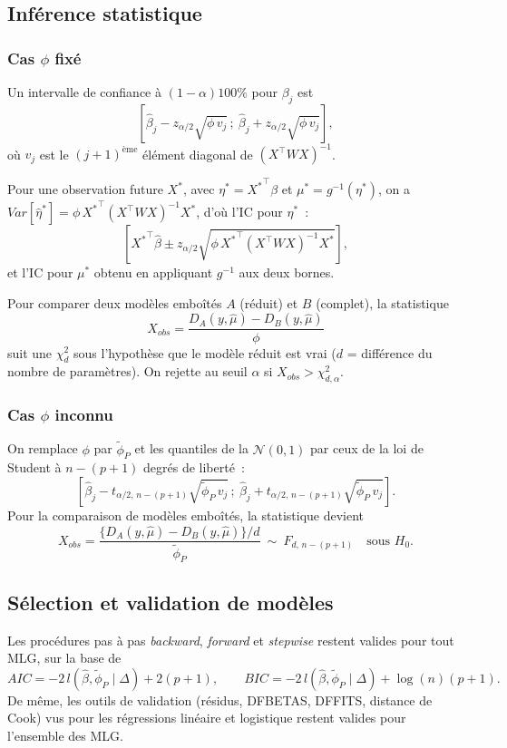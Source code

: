 \documentclass[11pt,letterpaper]{article}
\begin{document}
\subsection{Inférence statistique}

\subsubsection{Cas $\phi$ fixé}

Un intervalle de confiance à $(1-\alpha)100\%$ pour $\beta_j$ est
$$\left[\hat\beta_j - z_{\alpha/2}\sqrt{\phi\, v_j}\,;\ \hat\beta_j + z_{\alpha/2}\sqrt{\phi\, v_j}\right],$$
où $v_j$ est le $(j+1)^{\text{ème}}$ élément diagonal de $(X^\top W X)^{-1}$.

Pour une observation future $X^*$, avec $\eta^* = {X^*}^\top\beta$ et $\mu^* = g^{-1}(\eta^*)$, on a $Var[\hat\eta^*] = \phi\,{X^*}^\top(X^\top W X)^{-1}X^*$, d'où l'IC pour $\eta^*$~:
$$\left[{X^*}^\top\hat\beta \pm z_{\alpha/2}\sqrt{\phi\,{X^*}^\top(X^\top WX)^{-1}X^*}\right],$$
et l'IC pour $\mu^*$ obtenu en appliquant $g^{-1}$ aux deux bornes.

Pour comparer deux modèles emboîtés $A$ (réduit) et $B$ (complet), la statistique
$$X_{obs} = \frac{D_A(y,\hat\mu) - D_B(y,\hat\mu)}{\phi}$$
suit une $\chi^2_d$ sous l'hypothèse que le modèle réduit est vrai ($d$ = différence du nombre de paramètres). On rejette au seuil $\alpha$ si $X_{obs} > \chi^2_{d,\alpha}$.

\subsubsection{Cas $\phi$ inconnu}

On remplace $\phi$ par $\tilde\phi_P$ et les quantiles de la $\mathcal{N}(0,1)$ par ceux de la loi de Student à $n-(p+1)$ degrés de liberté~:
$$\left[\hat\beta_j - t_{\alpha/2,\,n-(p+1)}\sqrt{\tilde\phi_P\, v_j}\,;\ \hat\beta_j + t_{\alpha/2,\,n-(p+1)}\sqrt{\tilde\phi_P\, v_j}\right].$$
Pour la comparaison de modèles emboîtés, la statistique devient
$$X_{obs} = \frac{\{D_A(y,\hat\mu) - D_B(y,\hat\mu)\}/d}{\tilde\phi_P}\ \sim\ F_{d,\,n-(p+1)} \quad\mbox{sous } H_0.$$

\subsection{Sélection et validation de modèles}

Les procédures pas à pas \textit{backward}, \textit{forward} et \textit{stepwise} restent valides pour tout MLG, sur la base de
$$AIC = -2\,l(\hat\beta,\tilde\phi_P\mid\Delta) + 2(p+1), \qquad BIC = -2\,l(\hat\beta,\tilde\phi_P\mid\Delta) + \log(n)(p+1).$$
De même, les outils de validation (résidus, DFBETAS, DFFITS, distance de Cook) vus pour les régressions linéaire et logistique restent valides pour l'ensemble des MLG.
\end{document}
